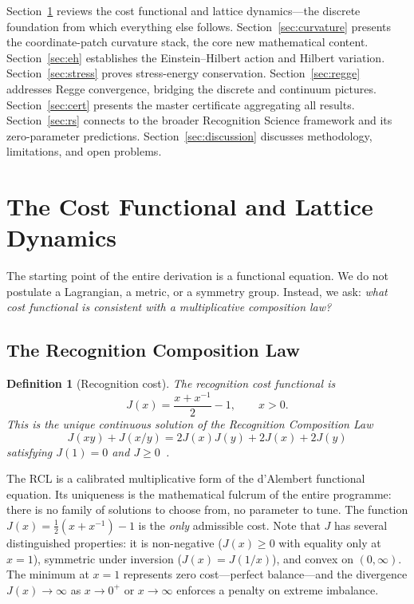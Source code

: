 \documentclass[11pt,a4paper]{article}
\newtheorem{definition}[theorem]{Definition}
\newcommand{\Jcost}{J}
\begin{document}
Section~\ref{sec:cost} reviews the cost functional and lattice dynamics---the discrete foundation from which everything else follows.
Section~\ref{sec:curvature} presents the coordinate-patch curvature stack, the core new mathematical content.
Section~\ref{sec:eh} establishes the Einstein--Hilbert action and Hilbert variation.
Section~\ref{sec:stress} proves stress-energy conservation.
Section~\ref{sec:regge} addresses Regge convergence, bridging the discrete and continuum pictures.
Section~\ref{sec:cert} presents the master certificate aggregating all results.
Section~\ref{sec:rs} connects to the broader Recognition Science framework and its zero-parameter predictions.
Section~\ref{sec:discussion} discusses methodology, limitations, and open problems.

\section{The Cost Functional and Lattice Dynamics}
\label{sec:cost}

The starting point of the entire derivation is a functional equation.
We do not postulate a Lagrangian, a metric, or a symmetry group.
Instead, we ask: \emph{what cost functional is consistent with a multiplicative composition law?}

\subsection{The Recognition Composition Law}

\begin{definition}[Recognition cost]
\label{def:jcost}
The \emph{recognition cost functional} is
\begin{equation}\label{eq:Jcost}
\Jcost(x) = \frac{x + x^{-1}}{2} - 1, \qquad x > 0.
\end{equation}
This is the unique continuous solution of the \emph{Recognition Composition Law}
\begin{equation}\label{eq:RCL}
\Jcost(xy) + \Jcost(x/y) = 2\Jcost(x)\Jcost(y) + 2\Jcost(x) + 2\Jcost(y)
\end{equation}
satisfying $\Jcost(1) = 0$ and $\Jcost \ge 0$~\cite{WashburnZlatanovic2026}.
\end{definition}

The RCL is a calibrated multiplicative form of the d'Alembert functional equation.
Its uniqueness is the mathematical fulcrum of the entire programme: there is no family of solutions to choose from, no parameter to tune.
The function $\Jcost(x) = \tfrac{1}{2}(x + x^{-1}) - 1$ is the \emph{only} admissible cost.
Note that $\Jcost$ has several distinguished properties: it is non-negative ($\Jcost(x) \ge 0$ with equality only at $x=1$), symmetric under inversion ($\Jcost(x) = \Jcost(1/x)$), and convex on $(0,\infty)$.
The minimum at $x=1$ represents zero cost---perfect balance---and the divergence $\Jcost(x) \to \infty$ as $x \to 0^+$ or $x \to \infty$ enforces a penalty on extreme imbalance.
\end{document}
